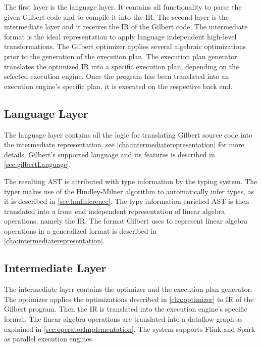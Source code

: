 The first layer is the language layer.
It contains all functionality to parse the given Gilbert code and to compile it into the IR.
The second layer is the intermediate layer and it receives the IR of the Gilbert code.
The intermediate format is the ideal representation to apply language independent high-level transformations.
The Gilbert optimizer applies several algebraic optimizations prior to the generation of the execution plan.
The execution plan generator translates the optimized IR into a specific execution plan, depending on the selected execution engine.
Once the program has been translated into an execution engine's specific plan, it is executed on the respective back end.

\subsection{Language Layer}

The language layer contains all the logic for translating Gilbert source code into the intermediate representation, see \cref{cha:intermediaterepresentation} for more details.
Gilbert's supported language and its features is described in \cref{sec:gilbertLanguage}.

The resulting AST is attributed with type information by the typing system.
The typer makes use of the Hindley-Milner algorithm to automatically infer types, as it is described in \cref{sec:hmInference}.
The type information enriched AST is then translated into a front end independent representation of linear algebra operations, namely the IR.
The format Gilbert uses to represent linear algebra operations in a generalized format is described in \cref{cha:intermediaterepresentation}.

\subsection{Intermediate Layer}

The intermediate layer contains the optimizer and the execution plan generator.
The optimizer applies the optimizations described in \cref{cha:optimizer} to IR of the Gilbert program.
Then the IR is translated into the execution engine's specific format.
The linear algebra operations are translated into a dataflow graph as explained in \cref{sec:operatorImplementation}.
The system supports Flink and Spark as parallel execution engines.